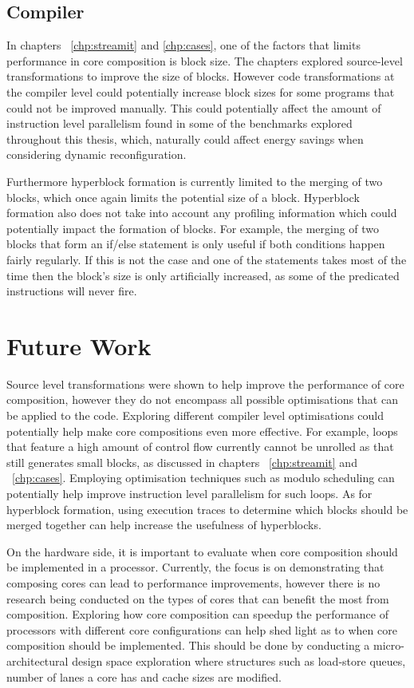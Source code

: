 \subsection{Compiler}
In chapters ~\ref{chp:streamit} and \ref{chp:cases}, one of the factors that limits performance in core composition is block size.
The chapters explored source-level transformations to improve the size of blocks.
However code transformations at the compiler level could potentially increase block sizes for some programs that could not be improved manually.
This could potentially affect the amount of instruction level parallelism found in some of the benchmarks explored throughout this thesis, which, naturally could affect energy savings when considering dynamic reconfiguration.

Furthermore hyperblock formation is currently limited to the merging of two blocks, which once again limits the potential size of a block.
Hyperblock formation also does not take into account any profiling information which could potentially impact the formation of blocks.
For example, the merging of two blocks that form an if/else statement is only useful if both conditions happen fairly regularly.
If this is not the case and one of the statements takes most of the time then the block's size is only artificially increased, as some of the predicated instructions will never fire.


\section{Future Work}

Source level transformations were shown to help improve the performance of core composition, however they do not encompass all possible optimisations that can be applied to the code.
Exploring different compiler level optimisations could potentially help make core compositions even more effective.
For example, loops that feature a high amount of control flow currently cannot be unrolled as that still generates small blocks, as discussed in chapters ~\ref{chp:streamit} and ~\ref{chp:cases}.
Employing optimisation techniques such as modulo scheduling can potentially help improve instruction level parallelism for such loops.
As for hyperblock formation, using execution traces to determine which blocks should be merged together can help increase the usefulness of hyperblocks.

On the hardware side, it is important to evaluate when core composition should be implemented in a processor.
Currently, the focus is on demonstrating that composing cores can lead to performance improvements, however there is no research being conducted on the types of cores that can benefit the most from composition.
Exploring how core composition can speedup the performance of processors with different core configurations can help shed light as to when core composition should be implemented.
This should be done by conducting a micro-architectural design space exploration where structures such as load-store queues, number of lanes a core has and cache sizes are modified.

